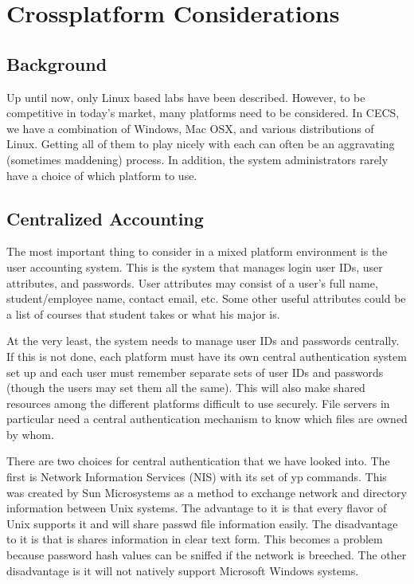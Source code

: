 \section{Crossplatform Considerations} \label{sec:crossplatform}
\subsection{Background}
Up until now, only Linux based labs have been described.  However, to be competitive in today's market, many platforms need to be considered.  In CECS, we have a combination of Windows, Mac OSX, and various distributions of Linux.   Getting all of them to play nicely with each can often be an aggravating (sometimes maddening) process.  In addition, the system administrators rarely have a choice of which platform to use.   
\subsection{Centralized Accounting}
The most important thing to consider in a mixed platform environment is the user accounting system.  This is the system that manages login user IDs, user attributes, and passwords.  User attributes may consist of a user's full name, student/employee name, contact email, etc.  Some other useful attributes could be a list of courses that student takes or what his major is.  

At the very least, the system needs to manage user IDs and passwords centrally.  If this is not done, each platform must have its own central authentication system set up and each user must remember separate sets of user IDs and passwords (though the users may set them all the same).  This will also make shared resources among the different platforms difficult to use securely.  File servers in particular need a central authentication mechanism to know which files are owned by whom.  

There are two choices for central authentication that we have looked into.  The first is Network Information Services (NIS) with its set of yp commands.  This was created by Sun Microsystems as a method to exchange network and directory information between Unix systems.  The advantage to it is that every flavor of Unix supports it and will share passwd file information easily.  The disadvantage to it is that is shares information in clear text form.  This becomes a problem because password hash values can be sniffed if the network is breeched.  The other disadvantage is it will not natively support Microsoft Windows systems.  

